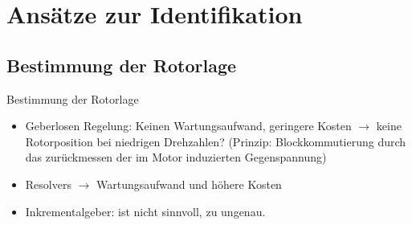 \documentclass{beamer}
\begin{document}
\section{Ansätze zur Identifikation}
\subsection{Bestimmung der Rotorlage}
\begin{frame}{Bestimmung der Rotorlage}
	\begin{itemize}
		\item Geberlosen Regelung: Keinen Wartungsaufwand, geringere Kosten $\rightarrow$ keine Rotorposition bei niedrigen Drehzahlen? (Prinzip: Blockkommutierung durch das zurückmessen der im Motor induzierten Gegenspannung)
		\item Resolvers $\rightarrow$ Wartungsaufwand und höhere Kosten
		\item Inkrementalgeber: ist nicht sinnvoll, zu ungenau.
	\end{itemize}
\end{frame}
\end{document}
